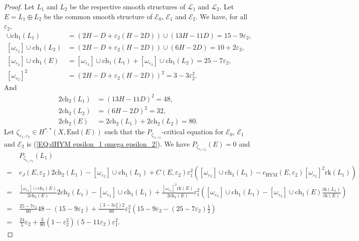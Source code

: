 \documentclass{article}
\theoremstyle{remark}
\theoremstyle{definition}
\newcommand{\rk}{\mathrm{rk}}
\newcommand{\End}{\mathrm{End}}
\newcommand{\E}{\mathcal{E}}
\newcommand{\mL}{\mathcal{L}}
\newcommand{\ch}{\mathrm{ch}}
\begin{document}
\begin{proof}
Let $L_1$ and $L_2$ be the respective smooth structures of $\mL_1$ and $\mL_2$. Let $E = L_1 \oplus L_2$ be the common smooth structure of $\E_0$, $\E_1$ and $\E_2$. We have, for all $\varepsilon_2$,
\begin{align*}
    [\omega_{\varepsilon_2}] \cup \ch_1(L_1) & = (2H - D + \varepsilon_2(H - 2D)) \cup (13H - 11D) = 15 - 9\varepsilon_2,\\
    [\omega_{\varepsilon_2}] \cup \ch_1(L_2) & = (2H - D + \varepsilon_2(H - 2D)) \cup (6H - 2D) = 10 + 2\varepsilon_2,\\
    [\omega_{\varepsilon_2}] \cup \ch_1(E) & = [\omega_{\varepsilon_2}] \cup \ch_1(L_1) + [\omega_{\varepsilon_2}] \cup \ch_1(L_2) = 25 - 7\varepsilon_2,\\
    [\omega_{\varepsilon_2}]^2 & = (2H - D + \varepsilon_2(H - 2D))^2 = 3 - 3\varepsilon_2^2.
\end{align*}
And
\begin{align*}
    2\ch_2(L_1) & = (13H - 11D)^2 = 48,\\
    2\ch_2(L_2) & = (6H - 2D)^2 = 32,\\
    2\ch_2(E) & = 2\ch_2(L_1) + 2\ch_2(L_2) = 80.
\end{align*}
Let $\zeta_{\varepsilon_1,\varepsilon_2} \in H^{*,*}(X,\End(E))$ such that the $P_{\zeta_{\varepsilon_1,\varepsilon_2}}$-critical equation for $\E_0$, $\E_1$ and $\E_2$ is (\ref{EQ:dHYM epsilon_1 omega epsilon_2}). We have $P_{\zeta_{\varepsilon_1,\varepsilon_2}}(E) = 0$ and
\begin{align*}
    & P_{\zeta_{\varepsilon_1,\varepsilon_2}}(L_1)\\
    =\ & c_J(E,\varepsilon_2)2\ch_2(L_1) - [\omega_{\varepsilon_2}] \cup \ch_1(L_1) + C(E,\varepsilon_2)\varepsilon_1^2([\omega_{\varepsilon_2}] \cup \ch_1(L_1) - c_{\mathrm{HYM}}(E,\varepsilon_2)[\omega_{\varepsilon_2}]^2\rk(L_1))\\
    =\ & \frac{[\omega_{\varepsilon_2}] \cup \ch_1(E)}{2\ch_2(E)}2\ch_2(L_1) - [\omega_{\varepsilon_2}] \cup \ch_1(L_1) + \frac{[\omega_{\varepsilon_2}]^2\rk(E)}{2\ch_2(E)}\varepsilon_1^2\left([\omega_{\varepsilon_2}] \cup \ch_1(L_1) - [\omega_{\varepsilon_2}] \cup \ch_1(E)\frac{\rk(L_1)}{\rk(E)}\right)\\
    =\ & \frac{25 - 7\varepsilon_2}{80}48 - (15 - 9\varepsilon_2) + \frac{(3 - 3\varepsilon_2^2)2}{80}\varepsilon_1^2\left(15 - 9\varepsilon_2 - (25 - 7\varepsilon_2)\frac{1}{2}\right)\\
    =\ & \frac{24}{5}\varepsilon_2 + \frac{3}{80}(1 - \varepsilon_2^2)(5 - 11\varepsilon_2)\varepsilon_1^2.

\end{align*}
\end{proof}
\end{document}
